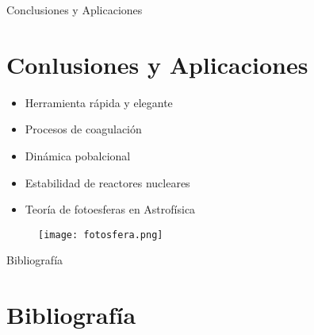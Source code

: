 \documentclass{beamer}
\begin{document}
\begin{frame}{Conclusiones y Aplicaciones}\section{Conlusiones y Aplicaciones}

    \begin{itemize}
        \item Herramienta rápida y elegante 
        \item Procesos de coagulación
        \item Dinámica pobalcional
        \item Estabilidad de reactores nucleares
        \item Teoría de fotoesferas en Astrofísica \cite{sobolev1969course}
    \end{itemize}
    \begin{figure}
        \centering
        \texttt{[image: fotosfera.png]}
        \label{fig:enter-label}
    \end{figure}
    
\end{frame}

\begin{frame}[allowframebreaks]{Bibliografía}
    \section{Bibliografía}
    \printbibliography
\end{frame}
\end{document}
